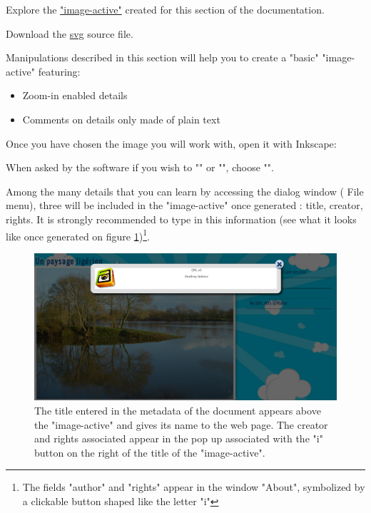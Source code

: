 \begin{links}
Explore the \href{http://images-actives.crdp-versailles.fr/beta/demo/tuto/xia1}{"image-active"} created for this section of the documentation.

Download the \href{http://images-actives.crdp-versailles.fr/beta/demo/tuto/xia1/svg/xia1.svg}{svg} source file.
\end{links}

Manipulations described in this section will help you to
create a "basic" "image-active" featuring:
\begin{itemize}
 \item Zoom-in enabled details
 \item Comments on details only made of plain text
\end{itemize}


Once you have chosen the image you will work with, open it with Inkscape:


When asked by the software if you wish to "" or "", choose "".

Among the many details that you can learn by accessing the 
dialog window  (\chemin
{File} menu), three will be included in the "image-active" once
generated : title, creator, rights. It is strongly recommended to type in this information
(see what it looks like once generated on figure \ref{titre_ia})\footnote{The
fields "author" and "rights" appear in the window
"About", symbolized by a clickable button shaped like the letter "i"}.

\begin{figure}[htp]
 \centering
 \includegraphics[width=\textwidth,clip=true,trim=0mm 120mm 55mm 0mm ]{images/titre_ia}
 \caption{The title entered in the metadata of the document appears above 
the "image-active" and gives its name to the web page. The creator and 
 rights associated appear in the pop up associated with the "i" button 
on the right of the title of the "image-active".}
 \label{titre_ia}
\end{figure}

